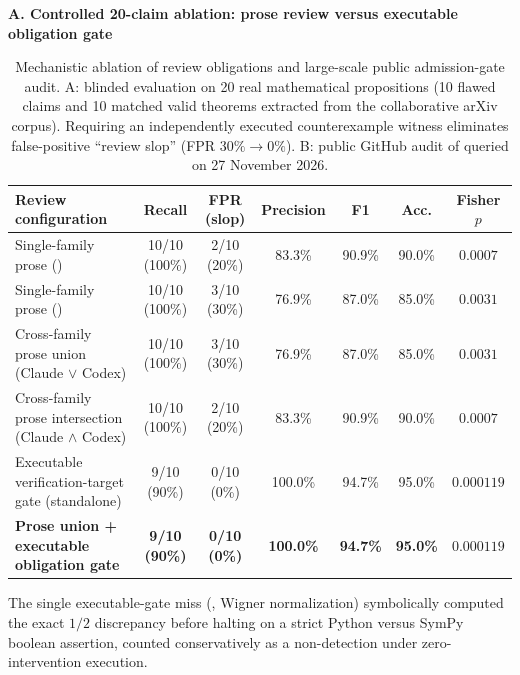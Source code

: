 \begin{table}[htbp]
\centering\footnotesize
\caption{Mechanistic ablation of review obligations and large-scale public admission-gate audit. A: blinded evaluation on 20 real mathematical propositions (10 flawed claims and 10 matched valid theorems extracted from the collaborative arXiv corpus). Requiring an independently executed counterexample witness eliminates false-positive ``review slop'' (FPR $30\%\to 0\%$). B: public GitHub audit of  queried on 27 November 2026.}
\label{tab:ablation}
\textbf{A. Controlled 20-claim ablation: prose review versus executable obligation gate}\par\smallskip
\begin{tabularx}{\linewidth}{@{}Ycccccc@{}}
\toprule Review configuration & Recall & FPR (slop) & Precision & F1 & Acc. & Fisher $p$ \\ \midrule
Single-family prose () & 10/10 (100\%) & 2/10 (20\%) & 83.3\% & 90.9\% & 90.0\% & $0.0007$ \\
Single-family prose () & 10/10 (100\%) & 3/10 (30\%) & 76.9\% & 87.0\% & 85.0\% & $0.0031$ \\
Cross-family prose union (Claude $\lor$ Codex) & 10/10 (100\%) & 3/10 (30\%) & 76.9\% & 87.0\% & 85.0\% & $0.0031$ \\
Cross-family prose intersection (Claude $\land$ Codex) & 10/10 (100\%) & 2/10 (20\%) & 83.3\% & 90.9\% & 90.0\% & $0.0007$ \\
Executable verification-target gate (standalone) & 9/10 (90\%) & 0/10 (0\%) & 100.0\% & 94.7\% & 95.0\% & $0.000119$ \\
\textbf{Prose union + executable obligation gate} & \textbf{9/10 (90\%)} & \textbf{0/10 (0\%)} & \textbf{100.0\%} & \textbf{94.7\%} & \textbf{95.0\%} & $0.000119$ \\
\bottomrule\end{tabularx}
\smallskip
\begin{minipage}{\linewidth}\scriptsize The single executable-gate miss (, Wigner normalization) symbolically computed the exact $1/2$ discrepancy before halting on a strict Python  versus SymPy boolean assertion, counted conservatively as a non-detection under zero-intervention execution.\end{minipage}
\par\vspace{7pt}

\end{table}
